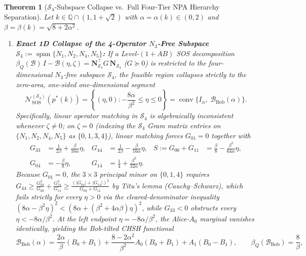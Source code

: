 \documentclass[11pt,a4paper]{article}
\newtheorem{theorem}{Theorem}[section]
\newcommand{\QQ}{\mathbb{Q}}
\newcommand{\calB}{\mathcal{B}}
\newcommand{\calS}{\mathcal{S}}
\newcommand{\conv}{\operatorname{conv}}
\begin{document}
\begin{theorem}[$\calS_4$-Subspace Collapse vs.\ Full Four-Tier NPA Hierarchy Separation]
\label{thm:hierarchy}
Let $k \in \QQ \cap (1, 1+\sqrt{2})$ with $\alpha = \alpha(k) \in (0,2)$ and $\beta = \beta(k) = \sqrt{8+2\alpha^2}$.
\begin{enumerate}[leftmargin=1.8em,itemsep=3pt]
  \item \textbf{Exact 1D Collapse of the 4-Operator $N_3$-Free Subspace $\calS_4 := \operatorname{span}\{N_1, N_2, N_4, N_5\}$:}
  If a Level-$(1+AB)$ SOS decomposition $\beta_Q(\calB)\,I - \calB(\eta,\zeta) = \mathbf{N}_{\calS_4}^\top G\,\mathbf{N}_{\calS_4}$ ($G \succeq 0$) is restricted to the four-dimensional $N_3$-free subspace $\calS_4$, the feasible region collapses strictly to the zero-area, one-sided one-dimensional segment
  \begin{equation}
    \mathcal{N}_{\mathrm{SOS}}^{(\calS_4)}(p^*(k)) = \left\{(\eta, 0) : -\frac{8\alpha}{\beta^2} \le \eta \le 0\right\} = \conv\bigl\{I_\alpha,\; \calB_{\mathrm{Bob}}(\alpha)\bigr\}.
    \label{eq:s4-segment}
  \end{equation}
  Specifically, linear operator matching in $\calS_4$ is algebraically inconsistent whenever $\zeta \neq 0$; on $\zeta = 0$ (indexing the $\calS_4$ Gram matrix entries on $\{N_1, N_2, N_4, N_5\}$ as $\{0, 1, 3, 4\}$), linear matching forces $G_{01} = 0$ together with
  \begin{align}
    G_{33} &= \frac{1}{2\beta} + \frac{\beta}{16\alpha}\eta, &
    G_{44} &= \frac{1}{2\beta} - \frac{\beta}{16\alpha}\eta, &
    S := G_{00}+G_{11} &= \frac{\beta}{8} - \frac{\beta^3}{64\alpha}\eta, \nonumber\\
    G_{04} &= -\frac{\beta}{8}\eta, &
    G_{14} &= \frac{1}{4} + \frac{\beta^2}{32\alpha}\eta.
    \label{eq:s4-forced}
  \end{align}
  Because $G_{01} = 0$, the $3\times 3$ principal minor on $\{0,1,4\}$ requires $G_{44} \ge \frac{G_{04}^2}{G_{00}} + \frac{G_{14}^2}{G_{11}} \ge \frac{(|G_{04}|+|G_{14}|)^2}{G_{00}+G_{11}}$ by Titu's lemma (Cauchy--Schwarz), which fails strictly for every $\eta > 0$ via the cleared-denominator inequality $(8\alpha - \beta^2 \eta)^2 < (8\alpha + (\beta^2 + 4\alpha\beta)\eta)^2$, while $G_{33} < 0$ obstructs every $\eta < -8\alpha/\beta^2$. At the left endpoint $\eta = -8\alpha/\beta^2$, the Alice-$A_0$ marginal vanishes identically, yielding the Bob-tilted CHSH functional
  \begin{equation}
    \calB_{\mathrm{Bob}}(\alpha) = \frac{2\alpha}{\beta}(B_0+B_1) + \frac{8 - 2\alpha^2}{\beta^2} A_0(B_0+B_1) + A_1(B_0-B_1), \qquad \beta_Q(\calB_{\mathrm{Bob}}) = \frac{8}{\beta},

\end{equation}
\end{enumerate}
\end{theorem}
\end{document}
